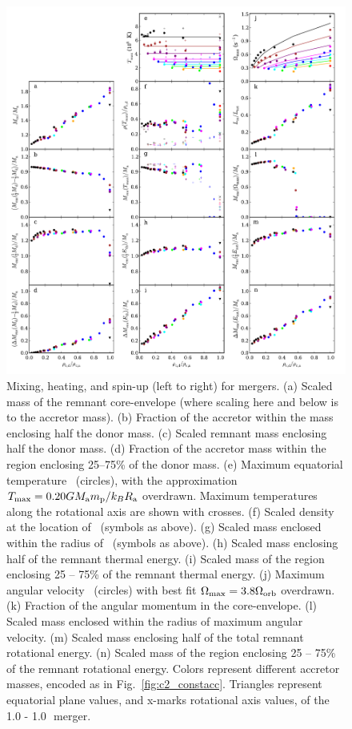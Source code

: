 \begin{figure}
\centering
\includegraphics[angle=0,width=1.0\columnwidth]{chapter2_zhu+13/figures/RestofTrendsq.pdf}
\caption{Mixing, heating, and spin-up (left to right) for mergers. (a) Scaled mass of the remnant core-envelope (where scaling here and below is to the accretor mass).  (b) Fraction of the accretor within the mass enclosing half the donor mass.  (c) Scaled remnant mass enclosing half the donor mass.  (d) Fraction of the accretor mass within the region enclosing 25--75\% of the donor mass.  (e) Maximum equatorial temperature \Tmax\ (circles), with the approximation $\Tmax=0.20G\Ma m_\mathrm{p}/k_B\Ra$ overdrawn.  Maximum temperatures along the rotational axis are shown with crosses.  (f) Scaled density at the location of \Tmax\ (symbols as above).  (g) Scaled mass enclosed within the radius of \Tmax\ (symbols as above).  (h) Scaled mass enclosing half of the remnant thermal energy.  (i) Scaled mass of the region enclosing 25 -- 75\% of the remnant thermal energy.  (j) Maximum angular velocity \Omegamax\ (circles) with best fit $\Omegamax=3.8\Omega_\mrm{orb}$ overdrawn.  (k) Fraction of the angular momentum in the core-envelope.  (l) Scaled mass enclosed within the radius of maximum angular velocity.  (m) Scaled mass enclosing half of the total remnant rotational energy.  (n) Scaled mass of the region enclosing 25 -- 75\% of the remnant rotational energy.  Colors represent different accretor masses, encoded as in Fig.~\ref{fig:c2_constacc}.  Triangles represent equatorial plane values, and x-marks rotational axis values, of the 1.0 - 1.0\,\Msun\ merger.}
\label{fig:c2_restoftrends}
\end{figure}

